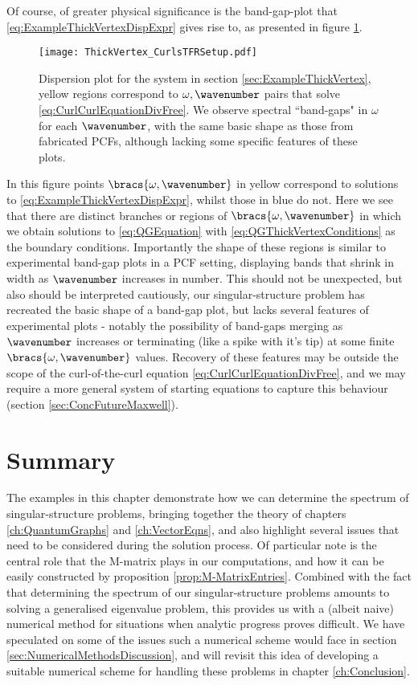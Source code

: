 Of course, of greater physical significance is the band-gap-plot that \eqref{eq:ExampleThickVertexDispExpr} gives rise to, as presented in figure \ref{fig:ThickVertex_CurlsTFRSetup}.
\begin{figure}[b!]
	\centering
	\texttt{[image: ThickVertex\_CurlsTFRSetup.pdf]}
	\caption{\label{fig:ThickVertex_CurlsTFRSetup} Dispersion plot for the system in section \ref{sec:ExampleThickVertex}, yellow regions correspond to $\omega, \wavenumber$ pairs that solve \eqref{eq:CurlCurlEquationDivFree}. We observe spectral ``band-gaps" in $\omega$ for each $\wavenumber$, with the same basic shape as those from fabricated PCFs, although lacking some specific features of these plots.}
\end{figure}
In this figure points $\bracs{\omega, \wavenumber}$ in yellow correspond to solutions to \eqref{eq:ExampleThickVertexDispExpr}, whilst those in blue do not.
Here we see that there are distinct branches or regions of $\bracs{\omega, \wavenumber}$ in which we obtain solutions to \eqref{eq:QGEquation} with \eqref{eq:QGThickVertexConditions} as the boundary conditions.
Importantly the shape of these regions is similar to experimental band-gap plots in a PCF setting, displaying bands that shrink in width as $\wavenumber$ increases in number.
This should not be unexpected, but also should be interpreted cautiously, our singular-structure problem has recreated the basic shape of a band-gap plot, but lacks several features of experimental plots - notably the possibility of band-gaps merging as $\wavenumber$ increases or terminating (like a spike with it's tip) at some finite $\bracs{\omega, \wavenumber}$ values.
Recovery of these features may be outside the scope of the curl-of-the-curl equation \eqref{eq:CurlCurlEquationDivFree}, and we may require a more general system of starting equations to capture this behaviour (section \ref{sec:ConcFutureMaxwell}).

\section{Summary} \label{sec:ExamplesSummary}
The examples in this chapter demonstrate how we can determine the spectrum of singular-structure problems, bringing together the theory of chapters \ref{ch:QuantumGraphs} and \ref{ch:VectorEqns}, and also highlight several issues that need to be considered during the solution process.
Of particular note is the central role that the M-matrix plays in our computations, and how it can be easily constructed by proposition \ref{prop:M-MatrixEntries}.
Combined with the fact that determining the spectrum of our singular-structure problems amounts to solving a generalised eigenvalue problem, this provides us with a (albeit naive) numerical method for situations when analytic progress proves difficult.
We have speculated on some of the issues such a numerical scheme would face in section \ref{sec:NumericalMethodsDiscussion}, and will revisit this idea of developing a suitable numerical scheme for handling these problems in chapter \ref{ch:Conclusion}. \newline


